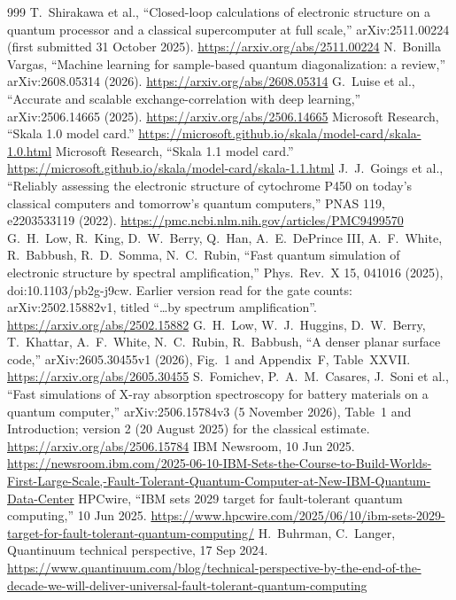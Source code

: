 \documentclass[10pt,a4paper]{article}
\begin{document}
\begin{thebibliography}{999}
 T.~Shirakawa et al., ``Closed-loop calculations of electronic structure on a quantum processor and a classical supercomputer at full scale,'' arXiv:2511.00224 (first submitted 31 October 2025). \url{https://arxiv.org/abs/2511.00224}
 N.~Bonilla Vargas, ``Machine learning for sample-based quantum diagonalization: a review,'' arXiv:2608.05314 (2026). \url{https://arxiv.org/abs/2608.05314}
 G.~Luise et al., ``Accurate and scalable exchange-correlation with deep learning,'' arXiv:2506.14665 (2025). \url{https://arxiv.org/abs/2506.14665}
 Microsoft Research, ``Skala 1.0 model card.'' \url{https://microsoft.github.io/skala/model-card/skala-1.0.html}
 Microsoft Research, ``Skala 1.1 model card.'' \url{https://microsoft.github.io/skala/model-card/skala-1.1.html}
 J.~J.~Goings et al., ``Reliably assessing the electronic structure of cytochrome P450 on today's classical computers and tomorrow's quantum computers,'' PNAS 119, e2203533119 (2022). \url{https://pmc.ncbi.nlm.nih.gov/articles/PMC9499570}
 G.~H.~Low, R.~King, D.~W.~Berry, Q.~Han, A.~E.~DePrince III, A.~F.~White, R.~Babbush, R.~D.~Somma, N.~C.~Rubin, ``Fast quantum simulation of electronic structure by spectral amplification,'' Phys.\ Rev.\ X 15, 041016 (2025), doi:10.1103/pb2g-j9cw. Earlier version read for the gate counts: arXiv:2502.15882v1, titled ``\ldots by spectrum amplification''. \url{https://arxiv.org/abs/2502.15882}
 G.~H.~Low, W.~J.~Huggins, D.~W.~Berry, T.~Khattar, A.~F.~White, N.~C.~Rubin, R.~Babbush, ``A denser planar surface code,'' arXiv:2605.30455v1 (2026), Fig.~1 and Appendix~F, Table~XXVII. \url{https://arxiv.org/abs/2605.30455}
 S.~Fomichev, P.~A.~M.~Casares, J.~Soni et al., ``Fast simulations of X-ray absorption spectroscopy for battery materials on a quantum computer,'' arXiv:2506.15784v3 (5 November 2026), Table~1 and Introduction; version 2 (20 August 2025) for the classical estimate. \url{https://arxiv.org/abs/2506.15784}
 IBM Newsroom, 10 Jun 2025. \url{https://newsroom.ibm.com/2025-06-10-IBM-Sets-the-Course-to-Build-Worlds-First-Large-Scale,-Fault-Tolerant-Quantum-Computer-at-New-IBM-Quantum-Data-Center}
 HPCwire, ``IBM sets 2029 target for fault-tolerant quantum computing,'' 10 Jun 2025. \url{https://www.hpcwire.com/2025/06/10/ibm-sets-2029-target-for-fault-tolerant-quantum-computing/}
 H.~Buhrman, C.~Langer, Quantinuum technical perspective, 17 Sep 2024. \url{https://www.quantinuum.com/blog/technical-perspective-by-the-end-of-the-decade-we-will-deliver-universal-fault-tolerant-quantum-computing}

\end{thebibliography}
\end{document}
